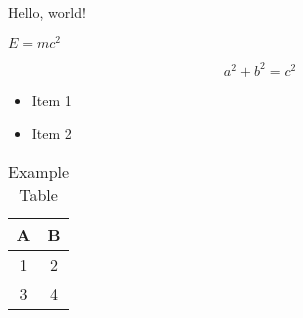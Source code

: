 
\



Hello, world!

$E=mc^2$

\begin{equation}
a^2 + b^2 = c^2
\end{equation}

\begin{itemize}
    \item Item 1
    \item Item 2
\end{itemize}

\begin{table}[h]
    \centering
    \begin{tabular}{c|c}
        A & B \\
        \hline
        1 & 2 \\
        3 & 4
    \end{tabular}
    \caption{Example Table}
\end{table}




